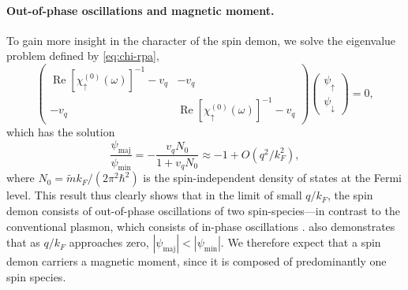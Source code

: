 \documentclass[aps,prl,reprint,twocolumns,superscriptaddress]{revtex4-2}
\DeclareMathOperator{\Ree}{Re}
\newcommand{\mdos}{\tilde{m}}
\newcommand{\kF}{k_{F}}
\begin{document}
	\paragraph{Out-of-phase oscillations and magnetic moment. }To gain more insight in the character of the spin demon, we solve the eigenvalue problem defined by \cref{eq:chi-rpa}, 
	\begin{equation}
		\begin{pmatrix}
			\Ree[\chi_{\uparrow}^{(0)}(\omega)]^{-1}-v_q & -v_q \\
			-v_q & \Ree[\chi_{\uparrow}^{(0)}(\omega)]^{-1}-v_q
		\end{pmatrix}\begin{pmatrix}
			\psi_\uparrow \\ \psi_\downarrow
		\end{pmatrix} =0,
	\end{equation}
	which has the solution
	\begin{equation}
		\frac{\psi_{{\mathrm{maj}}}}{\psi_{{\mathrm{min}}}} = -\frac{v_qN_0}{1 + v_qN_0}\approx -1 + O(q^2/\kF^2) \label{eq:out-of-phase},
	\end{equation} 
	where $N_0=\mdos \kF / (2\pi^2\hbar^2)$ is the spin-independent density of states at the Fermi level.
	This result thus clearly shows that in the limit of small $q/\kF$, the spin demon consists of out-of-phase oscillations of two spin-species---in contrast to the conventional plasmon, which consists of in-phase oscillations \cite{agarwalLonglivedSpinPlasmons2014}.  also demonstrates that as $q/\kF$ approaches zero, $|{\psi_{{\mathrm{maj}}}}| < |{\psi_{{\mathrm{min}}}}|$. We therefore expect that a spin demon carriers a magnetic moment, since it is composed of predominantly one spin species. 
\end{document}
